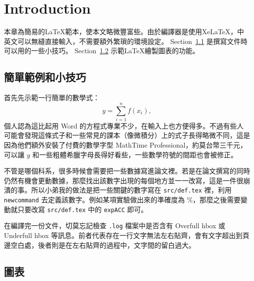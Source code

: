 \chapter{Introduction}
\label{cha:introduction}

本章為簡易的LaTeX範本，使本文略微豐富些。由於編譯器是使用XeLaTeX，中英文可以無縫直接輸入，不需要額外繁瑣的環境設定。 Section~\ref{sec:simpletechnique1} 是撰寫文件時可以用的一些小技巧。 Section~\ref{sec:figandtable} 示範LaTeX繪製圖表的功能。


\section{簡單範例和小技巧}
\label{sec:simpletechnique1}

首先先示範一行簡單的數學式：
\begin{equation} \label{eq:sample1}
  y = \sum_{i=1}^{n}f(x_i),
\end{equation}
個人認為這比起用 Word 的方程式專業不少，在輸入上也方便得多。不過有些人可能會發現這條式子和一些常見的課本（像微積分）上的式子長得略微不同，這是因為他們額外安裝了付費的數學字型 MathTime Professional，約莫台幣三千元，可以讓 $y$ 和一些粗體希臘字母長得好看些，一些數學符號的間距也會被修正。

不管是哪個科系，很多時候會需要把一些數據寫進論文裡。若是在論文撰寫的同時仍然有機會更動數據，那麼找出該數字出現的每個地方並一一改寫，這是一件很崩潰的事。所以小弟我的做法是把一些關鍵的數字寫在 \texttt{src/def.tex} 裡，利用 \texttt{newcommand} 去定義該數字。例如某項實驗做出來的準確度為 \expACC{}\%，那麼之後需要變動就只要改寫 \texttt{src/def.tex} 中的 \texttt{expACC} 即可。

在編譯完一份文件，切莫忘記檢查 \texttt{.log} 檔案中是否含有 Overfull hbox 或 Underfull hbox 等訊息。前者代表存在一行文字無法左右貼齊，會有文字超出到頁邊空白處，後者則是在左右貼齊的過程中，文字間的留白過大。


\section{圖表}
\label{sec:figandtable}

